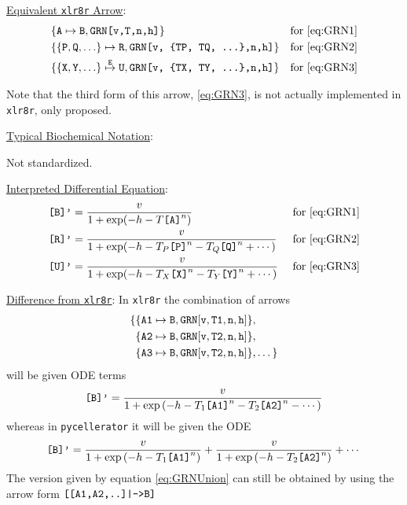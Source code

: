 \underline{Equivalent {\tt xlr8r} Arrow}: 
\begin{align*}
& \{{\tt A} \mapsto {\tt B}, \text{\tt GRN[v,T,n,h]}\} & \text{for \ref{eq:GRN1}}\\
& \{\{{\tt P, Q, \dots}\} \mapsto {\tt R}, \text{\tt GRN[v, \{TP, TQ, \dots\},n,h]}\} & \text{for \ref{eq:GRN2}}\\
& \{\{{\tt X, Y, \dots }\} \overset{\tt E}{\mapsto} {\tt U}, \text{\tt GRN[v,  \{TX, TY, \dots\},n,h]}\} & \text{for \ref{eq:GRN3}}\\
\end{align*}

Note that the third form of this arrow, \ref{eq:GRN3}, is not actually implemented in {\tt xlr8r}, only proposed.


\underline{Typical Biochemical Notation}: 

Not standardized.

\underline{Interpreted Differential Equation}:
\begin{align}
\text{\tt[B]'} &= \dfrac{v}{1+\exp(-h-T\text{\tt [A]}^n)} & \text{for \eqref{eq:GRN1}}\\
\text{\tt[R]'} &= \dfrac{v}{1+\exp(-h-T_P \text{\tt [P]}^n - T_Q \text{\tt [Q]}^n + \cdots )} &\text{ for \eqref{eq:GRN2}}\\
\text{\tt[U]'} &= \dfrac{v}{1+\exp(-h-T_X \text{\tt [X]}^n - T_Y \text{\tt [Y]}^n + \cdots )} &\text{ for \eqref{eq:GRN3}}
\end{align}

\underline{Difference from {\tt xlr8r}}: In {\tt xlr8r} the combination of arrows
\begin{equation}
\begin{split}
\{ & \{ {\tt A1} \mapsto {\tt B}, {\tt GRN[v, T1, n, h]}\}, \\
   & \{ {\tt A2} \mapsto {\tt B}, {\tt GRN[v, T2, n, h]}\}, \\
   & \{ {\tt A3} \mapsto {\tt B}, {\tt GRN[v, T2, n, h]}\},    
   \dots \}
\end{split}
\end{equation}
will be given ODE terms
\begin{equation}\label{eq:GRNUnion}
\text{\tt [B]'} = \dfrac{v}{1+\exp\left(-h - T_1 \text{\tt [A1]}^n - T_2 \text{\tt [A2]}^n - \cdots \right)}
\end{equation}
whereas in {\tt pycellerator} it will be given the ODE
\begin{equation*}
\text{\tt [B]'} = \dfrac{v}{1+\exp\left(-h - T_1 \text{\tt [A1]}^n  \right)}
+  \dfrac{v}{1+\exp\left(-h - T_2 \text{\tt [A2]}^n  \right)} + \cdots 
\end{equation*}
The version given by equation \eqref{eq:GRNUnion} can still be obtained by using the arrow form $\text{\tt[[A1,A2,..]|-->B]}$


